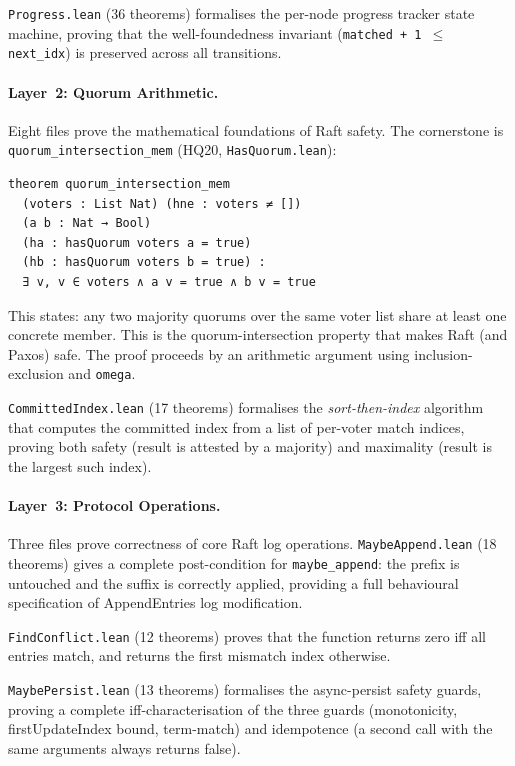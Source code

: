 \documentclass[sigconf,10pt]{acmart}
\begin{document}
\texttt{Progress.lean} (36 theorems) formalises the per-node progress
tracker state machine, proving that the well-foundedness invariant
(\texttt{matched + 1 $\leq$ next\_idx}) is preserved across all transitions.

\paragraph{Layer~2: Quorum Arithmetic.}
Eight files prove the mathematical foundations of Raft safety.
The cornerstone is \texttt{quorum\_intersection\_mem} (HQ20,
\texttt{HasQuorum.lean}):

\begin{lstlisting}[language=Lean4]
theorem quorum_intersection_mem
  (voters : List Nat) (hne : voters ≠ [])
  (a b : Nat → Bool)
  (ha : hasQuorum voters a = true)
  (hb : hasQuorum voters b = true) :
  ∃ v, v ∈ voters ∧ a v = true ∧ b v = true
\end{lstlisting}

This states: any two majority quorums over the same voter list share at
least one concrete member.  This is the quorum-intersection property that
makes Raft (and Paxos) safe.  The proof proceeds by an arithmetic argument
using inclusion-exclusion and \texttt{omega}.

\texttt{CommittedIndex.lean} (17 theorems) formalises the
\emph{sort-then-index} algorithm that computes the committed index from
a list of per-voter match indices, proving both safety (result is
attested by a majority) and maximality (result is the largest such index).

\paragraph{Layer~3: Protocol Operations.}
Three files prove correctness of core Raft log operations.
\texttt{MaybeAppend.lean} (18 theorems) gives a complete post-condition
for \texttt{maybe\_append}: the prefix is untouched
and the suffix is correctly applied, providing
a full behavioural specification of AppendEntries log modification.

\texttt{FindConflict.lean} (12 theorems) proves that the function
returns zero iff all entries match, and returns the first mismatch index
otherwise.

\texttt{MaybePersist.lean} (13 theorems) formalises the async-persist
safety guards, proving a complete iff-characterisation of the three
guards (monotonicity, firstUpdateIndex bound, term-match) and
idempotence (a second call with the same arguments always returns false).
\end{document}
